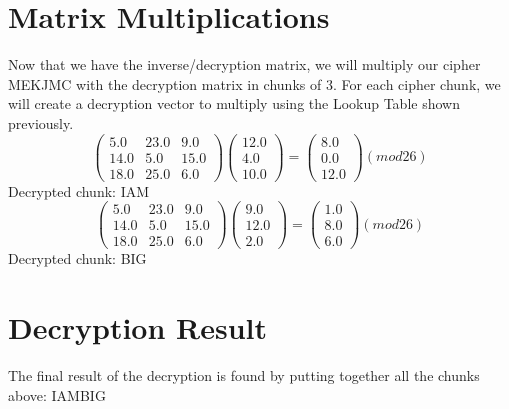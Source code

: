 \documentclass{article}%
\begin{document}
%
\section{Matrix Multiplications}%
\label{sec:MatrixMultiplications}%
Now that we have the inverse/decryption matrix, we will multiply our cipher MEKJMC with the decryption matrix in chunks of 3. For each cipher chunk, we will create a decryption vector to multiply using the Lookup Table shown previously.%
\[%
\begin{pmatrix}%
5.0&23.0&9.0\\%
14.0&5.0&15.0\\%
18.0&25.0&6.0%
\end{pmatrix} \begin{pmatrix}%
12.0\\%
4.0\\%
10.0%
\end{pmatrix} = \begin{pmatrix}%
8.0\\%
0.0\\%
12.0%
\end{pmatrix} (mod26)%
\]%
\newline%
%
Decrypted chunk: IAM%
\[%
\begin{pmatrix}%
5.0&23.0&9.0\\%
14.0&5.0&15.0\\%
18.0&25.0&6.0%
\end{pmatrix} \begin{pmatrix}%
9.0\\%
12.0\\%
2.0%
\end{pmatrix} = \begin{pmatrix}%
1.0\\%
8.0\\%
6.0%
\end{pmatrix} (mod26)%
\]%
\newline%
%
Decrypted chunk: BIG

%
\section{Decryption Result}%
\label{sec:DecryptionResult}%
The final result of the decryption is found by putting together all the chunks above: IAMBIG\newline%

%
\end{document}
